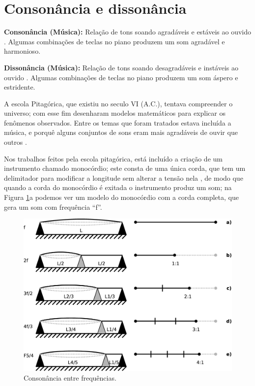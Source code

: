 \section{Consonância e dissonância}
\label{sec:consonancia}

\begin{tcbinformation} 
\label{ref:consonancia}
\textbf{Consonância (Música):}
Relação de tons soando agradáveis e estáveis ao ouvido \cite[pp. 26]{wright2012essential}.
Algumas combinações de teclas no piano produzem um som agradável e harmonioso.
\end{tcbinformation} 


\begin{tcbinformation} 
\label{ref:dissonancia}
\textbf{Dissonância (Música):}
Relação de tons soando desagradáveis e instáveis ao ouvido \cite[pp. 26]{wright2012essential}.
Algumas combinações de teclas no piano produzem um som áspero e estridente.
\end{tcbinformation} 



A escola Pitagórica, que existiu no seculo VI (A.C.),
tentava compreender o universo;
com esse fim desenharam modelos matemáticos para explicar 
os fenômenos observados.
Entre os temas que foram tratados estava incluída a música,
e porquê alguns conjuntos de sons eram mais 
agradáveis de ouvir que outros \cite[pp. 11]{arbones2012armonia}.

Nos trabalhos feitos pela escola pitagórica, 
está incluído a criação de um instrumento chamado monocórdio;
este consta de uma única corda,
que tem um delimitador para modificar a longitude sem alterar a tensão nela \cite[pp. 12]{arbones2012armonia},
de modo que quando a corda do monocórdio é exitada o instrumento produz um som;
na Figura \ref{fig:consonancia}a podemos ver um modelo do monocórdio com a corda completa, 
que gera um som com frequência ``f''.
\begin{figure}[!h]
  \centering
    \includegraphics[width=\textwidth]{chapters/cap-musica-composer/consonancia0.eps}
\caption{Consonância entre frequências.}
\label{fig:consonancia}
\end{figure}

